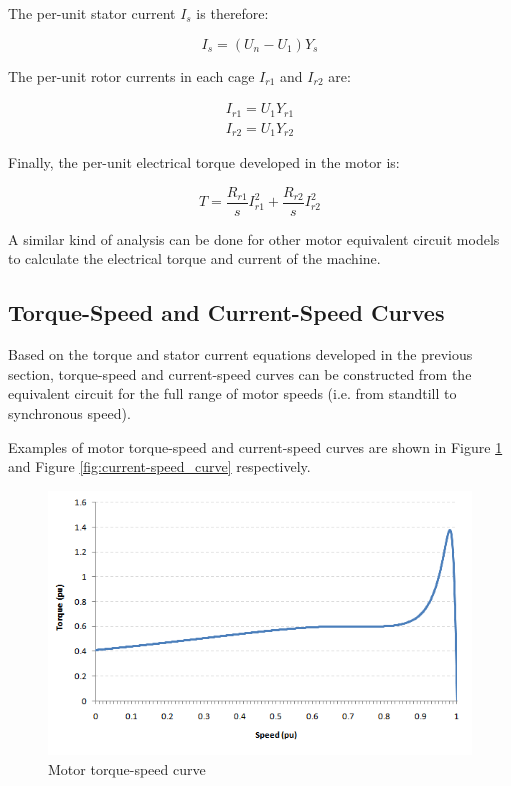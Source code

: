 \documentclass{article}
\begin{document}
The per-unit stator current $I_{s}$ is therefore:

\begin{equation}
I_{s} = \left( U_{n} - U_{1} \right) Y_{s} 
\end{equation}

The per-unit rotor currents in each cage $I_{r1}$ and $I_{r2}$ are:

\begin{eqnarray}
I_{r1} = U_{1} Y_{r1} \\
I_{r2} = U_{1} Y_{r2}
\end{eqnarray}

Finally, the per-unit electrical torque developed in the motor is:

\begin{equation}
T = \frac{R_{r1}}{s} I_{r1}^{2} + \frac{R_{r2}}{s} I_{r2}^{2}
\end{equation}

A similar kind of analysis can be done for other motor equivalent circuit models to calculate the electrical torque and current of the machine.

\subsection{Torque-Speed and Current-Speed Curves}
Based on the torque and stator current equations developed in the previous section, torque-speed and current-speed curves can be constructed from the equivalent circuit for the full range of motor speeds (i.e. from standtill to synchronous speed). 

Examples of motor torque-speed and current-speed curves are shown in Figure \ref{fig:torque-speed_curve} and Figure \ref{fig:current-speed_curve} respectively.

\begin{figure}[!htp]
\begin{center}
\includegraphics[scale=0.6]{Figures/torque-speed_curve.png}
\caption{Motor torque-speed curve}
\label{fig:torque-speed_curve}
\end{center}
\end{figure}
\end{document}
